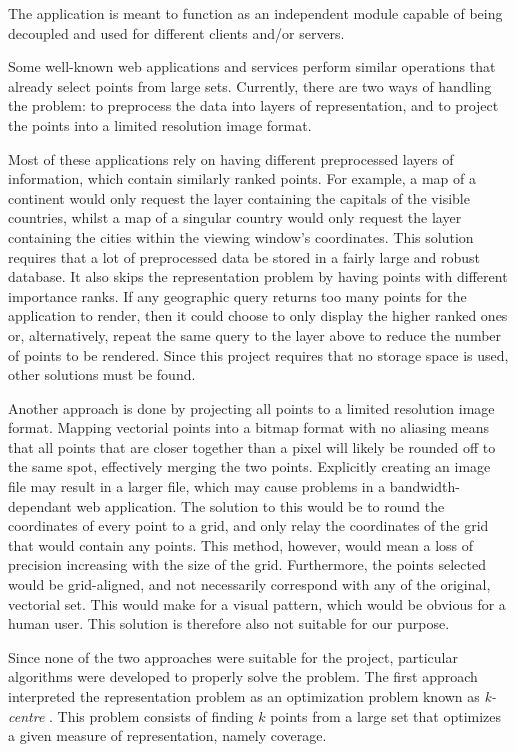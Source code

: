 

The application is meant to function as an independent module capable of being decoupled and used for different clients and/or servers.

Some well-known web applications and services perform similar operations that already select points from large sets. Currently, there are two ways of handling the problem: to preprocess the data into layers of representation, and to project the points into a limited resolution image format.

Most of these applications rely on having different preprocessed layers of information, which contain similarly ranked points. For example, a map of a continent would only request the layer containing the capitals of the visible countries, whilst a map of a singular country would only request the layer containing the cities within the viewing window's coordinates. This solution requires that a lot of preprocessed data be stored in a fairly large and robust database. It also skips the representation problem by having points with different importance ranks. If any geographic query returns too many points for the application to render, then it could choose to only display the higher ranked ones or, alternatively, repeat the same query to the layer above to reduce the number of points to be rendered. Since this project requires that no storage space is used, other solutions must be found.

Another approach is done by projecting all points to a limited resolution image format. Mapping vectorial points into a bitmap format with no aliasing means that all points that are closer together than a pixel will likely be rounded off to the same spot, effectively merging the two points. Explicitly creating an image file may result in a larger file, which may cause problems in a bandwidth-dependant web application. The solution to this would be to round the coordinates of every point to a grid, and only relay the coordinates of the grid that would contain any points. This method, however, would mean a loss of precision increasing with the size of the grid. Furthermore, the points selected would be grid-aligned, and not necessarily correspond with any of the original, vectorial set. This would make for a visual pattern, which would be obvious for a human user. This solution is therefore also not suitable for our purpose.

Since none of the two approaches were suitable for the project, particular algorithms were developed to properly solve the problem. The first approach interpreted the representation problem as an optimization problem known as \emph{k-centre} \cite{kcentre}. This problem consists of finding $k$ points from a large set that optimizes a given measure of representation, namely coverage.  


